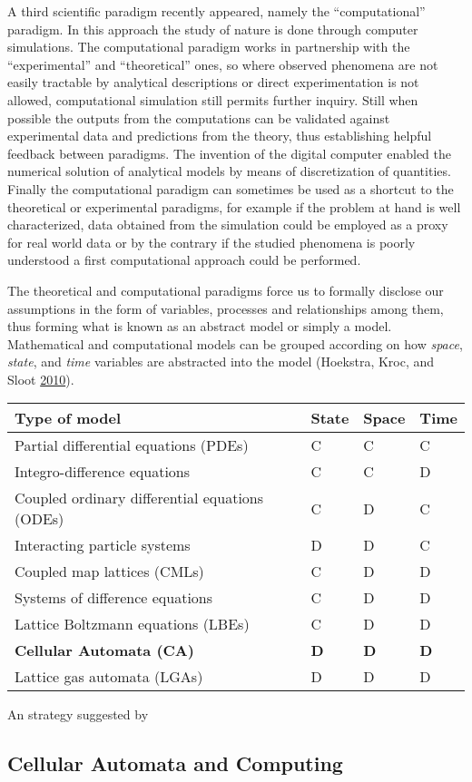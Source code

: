 \documentclass[
]{book}
\begin{document}
A third scientific paradigm recently appeared, namely the ``computational'' paradigm. In this approach the study of nature is done through computer simulations. The computational paradigm works in partnership with the ``experimental'' and ``theoretical'' ones, so where observed phenomena are not easily tractable by analytical descriptions or direct experimentation is not allowed, computational simulation still permits further inquiry. Still when possible the outputs from the computations can be validated against experimental data and predictions from the theory, thus establishing helpful feedback between paradigms. The invention of the digital computer enabled the numerical solution of analytical models by means of discretization of quantities. Finally the computational paradigm can sometimes be used as a shortcut to the theoretical or experimental paradigms, for example if the problem at hand is well characterized, data obtained from the simulation could be employed as a proxy for real world data or by the contrary if the studied phenomena is poorly understood a first computational approach could be performed.

The theoretical and computational paradigms force us to formally disclose our assumptions in the form of variables, processes and relationships among them, thus forming what is known as an abstract model or simply a model. Mathematical and computational models can be grouped according on how \emph{space}, \emph{state}, and \emph{time} variables are abstracted into the model (Hoekstra, Kroc, and Sloot \protect\hyperlink{ref-hoekstra2010simulating}{2010}).

\begin{longtable}[]{@{}llll@{}}
\toprule
Type of model & State & Space & Time\tabularnewline
\midrule
\endhead
Partial differential equations (PDEs) & C & C & C\tabularnewline
Integro-difference equations & C & C & D\tabularnewline
Coupled ordinary differential equations (ODEs) & C & D & C\tabularnewline
Interacting particle systems & D & D & C\tabularnewline
Coupled map lattices (CMLs) & C & D & D\tabularnewline
Systems of difference equations & C & D & D\tabularnewline
Lattice Boltzmann equations (LBEs) & C & D & D\tabularnewline
\textbf{Cellular Automata (CA)} & \textbf{D} & \textbf{D} & \textbf{D}\tabularnewline
Lattice gas automata (LGAs) & D & D & D\tabularnewline
\bottomrule
\end{longtable}

An strategy suggested by

\hypertarget{cellular-automata-and-computing}{%
\subsection{Cellular Automata and Computing}\label{cellular-automata-and-computing}}
\end{document}
